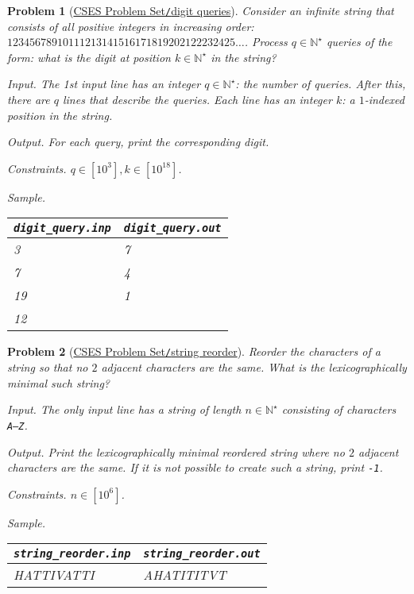 \documentclass{article}
\newtheorem{problem}{Problem}
\begin{document}
\begin{problem}[\href{https://cses.fi/problemset/task/2431}{CSES Problem Set{\tt/}digit queries}]
    Consider an infinite string that consists of all positive integers in increasing order: $12345678910111213141516171819202122232425\ldots$. Process $q\in\mathbb{N}^\star$ queries of the form: what is the digit at position $k\in\mathbb{N}^\star$ in the string?
    \item {\sf Input.} The 1st input line has an integer $q\in\mathbb{N}^\star$: the number of queries. After this, there are $q$ lines that describe the queries. Each line has an integer $k$: a $1$-indexed position in the string.
    \item {\sf Output.} For each query, print the corresponding digit.
    \item {\sf Constraints.} $q\in[10^3],k\in[10^{18}]$.
    \item {\sf Sample.}
    \begin{table}[H]
        \centering
        \begin{tabular}{|l|l|}
            \hline
            \verb|digit_query.inp| & \verb|digit_query.out| \\
            \hline
            3 & 7 \\
            7 & 4 \\
            19 & 1 \\
            12 & \\
            \hline
        \end{tabular}
    \end{table}
\end{problem}

\begin{problem}[\href{https://cses.fi/problemset/task/1743}{CSES Problem Set{\tt/}string reorder}]
    Reorder the characters of a string so that no $2$ adjacent characters are the same. What is the lexicographically minimal such string?
    \item {\sf Input.} The only input line has a string of length $n\in\mathbb{N}^\star$ consisting of characters {\tt A--Z}.
    \item {\sf Output.} Print the lexicographically minimal reordered string where no $2$ adjacent characters are the same. If it is not possible to create such a string, print {\tt-1}.
    \item {\sf Constraints.} $n\in[10^6]$.
    \item {\sf Sample.}
    \begin{table}[H]
        \centering
        \begin{tabular}{|l|l|}
            \hline
            \verb|string_reorder.inp| & \verb|string_reorder.out| \\
            \hline
            HATTIVATTI & AHATITITVT \\
            \hline
        \end{tabular}
    \end{table}
\end{problem}
\end{document}
